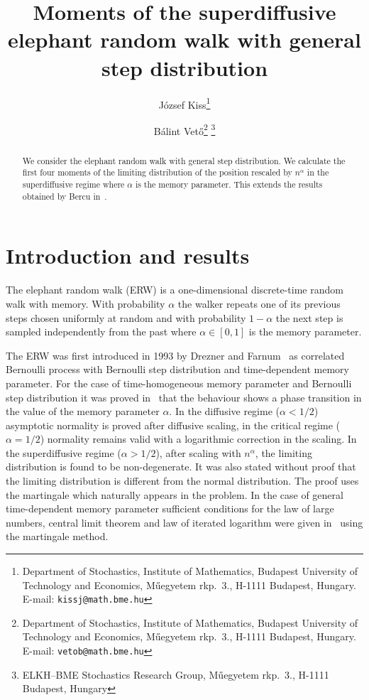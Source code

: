 \documentclass[12pt,a4paper]{article}
\title{Moments of the superdiffusive elephant random walk with general step distribution}
\author{J\'ozsef Kiss\thanks{Department of Stochastics, Institute of Mathematics,
Budapest University of Technology and Economics, M\H uegyetem rkp.\ 3., H-1111 Budapest, Hungary. E-mail: {\tt kissj@math.bme.hu}}
\and B\'alint Vet\H o\thanks{Department of Stochastics, Institute of Mathematics,
Budapest University of Technology and Economics, M\H uegyetem rkp.\ 3., H-1111 Budapest, Hungary. E-mail: {\tt vetob@math.bme.hu}}
\thanks{ELKH--BME Stochastics Research Group, M\H uegyetem rkp.\ 3., H-1111 Budapest, Hungary}}
\numberwithin{equation}{section}
\begin{document}
\maketitle

\begin{abstract}
We consider the elephant random walk with general step distribution.
We calculate the first four moments of the limiting distribution of the position rescaled by $n^\alpha$ in the superdiffusive regime
where $\alpha$ is the memory parameter.
This extends the results obtained by Bercu in~\cite{Bercu17}.
\end{abstract}

\section{Introduction and results}
The elephant random walk (ERW) is a one-dimensional discrete-time random walk with memory.
With probability $\alpha$ the walker repeats one of its previous steps chosen uniformly at random
and with probability $1-\alpha$ the next step is sampled independently from the past where $\alpha\in[0,1]$ is the memory parameter.

The ERW was first introduced in 1993 by Drezner and Farnum~\cite{DF93} as correlated Bernoulli process
with Bernoulli step distribution and time-dependent memory parameter.
For the case of time-homogeneous memory parameter and Bernoulli step distribution it was proved in~\cite{H04}
that the behaviour shows a phase transition in the value of the memory parameter $\alpha$.
In the diffusive regime ($\alpha<1/2$) asymptotic normality is proved after diffusive scaling,
in the critical regime ($\alpha=1/2$) normality remains valid with a logarithmic correction in the scaling.
In the superdiffusive regime ($\alpha>1/2$), after scaling with $n^{\alpha}$, the limiting distribution is found to be non-degenerate.
It was also stated without proof that the limiting distribution is different from the normal distribution.
The proof uses the martingale which naturally appears in the problem.
In the case of general time-dependent memory parameter sufficient conditions for the law of large numbers,
central limit theorem and law of iterated logarithm were given in~\cite{JJQ08} using the martingale method.
\end{document}
